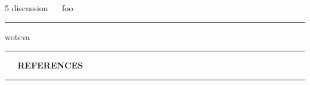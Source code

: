 \documentclass[11pt, compress, t, notes = noshow, xcolor = table, 
aspectratio = 1610]{beamer}
\newcommand{\highlight}[1]{\textcolor{highlightcol}{\textbf{#1}}}
\begin{document}

\LARGE
\begin{frame}{\textcolor{gray!90}{5 discussion} ~~ foo}
\normalsize
\vspace{-0.5cm}
\noindent \textcolor{gray!90}{\rule{\textwidth}{1pt}}


\medskip

woteva

\end{frame}


\LARGE
\begin{frame}{\phantom{foo}}
\normalsize
\vspace{-0.5cm}
\noindent \textcolor{gray!90}{\rule{\textwidth}{1pt}}
\smallskip

\Huge
\hspace{0pt}
\vfill
\textbf{\highlight{~~ REFERENCES}}
\vfill
\hspace{0pt}

\noindent \textcolor{gray!90}{\rule{\textwidth}{1pt}}

\end{frame}


\begin{frame}{}
\footnotesize




\end{frame}


\endlecture
\end{document}
